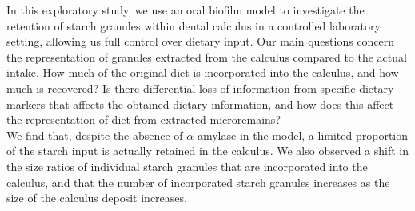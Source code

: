 \documentclass[
  letterpaper,
]{book}
\begin{document}
In this exploratory study, we use an oral biofilm model to investigate
the retention of starch granules within dental calculus in a controlled
laboratory setting, allowing us full control over dietary input. Our
main questions concern the representation of granules extracted from the
calculus compared to the actual intake. How much of the original diet is
incorporated into the calculus, and how much is recovered? Is there
differential loss of information from specific dietary markers that
affects the obtained dietary information, and how does this affect the
representation of diet from extracted microremains?\\
We find that, despite the absence of \(\alpha\)-amylase in the model, a
limited proportion of the starch input is actually retained in the
calculus. We also observed a shift in the size ratios of individual
starch granules that are incorporated into the calculus, and that the
number of incorporated starch granules increases as the size of the
calculus deposit increases.
\end{document}
